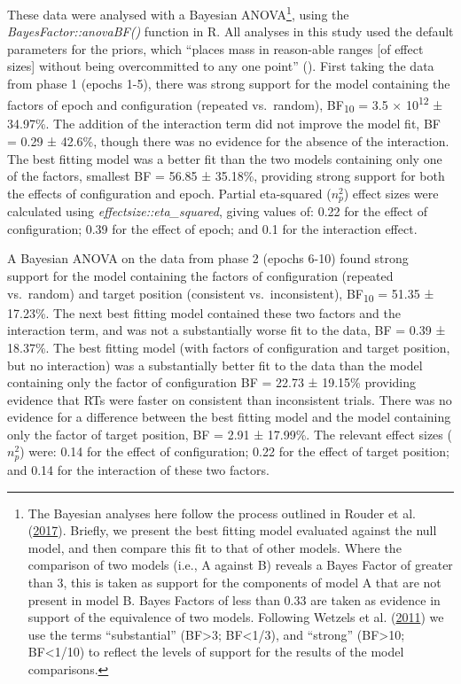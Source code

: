\documentclass[
  man,
  floatsintext,
  longtable,
  nolmodern,
  notxfonts,
  notimes,
  colorlinks=true,linkcolor=blue,citecolor=blue,urlcolor=blue]{apa7}
\begin{document}
These data were analysed with a Bayesian ANOVA\footnote{The Bayesian
  analyses here follow the process outlined in Rouder et al.
  (\hyperref[ref-rouder2017]{2017}). Briefly, we present the best
  fitting model evaluated against the null model, and then compare this
  fit to that of other models. Where the comparison of two models (i.e.,
  A against B) reveals a Bayes Factor of greater than 3, this is taken
  as support for the components of model A that are not present in model
  B. Bayes Factors of less than 0.33 are taken as evidence in support of
  the equivalence of two models. Following Wetzels et al.
  (\hyperref[ref-wetzels2011]{2011}) we use the terms ``substantial''
  (BF\textgreater3; BF\textless1/3), and ``strong'' (BF\textgreater10;
  BF\textless1/10) to reflect the levels of support for the results of
  the model comparisons.}, using the \emph{BayesFactor::anovaBF()}
function in R. All analyses in this study used the default parameters
for the priors, which ``places mass in reason-able ranges {[}of effect
sizes{]} without being overcommitted to any one point''
(). First taking
the data from phase 1 (epochs 1-5), there was strong support for the
model containing the factors of epoch and configuration (repeated
vs.~random), BF\textsubscript{10} = 3.5 × 10\textsuperscript{12} ±
34.97\%. The addition of the interaction term did not improve the model
fit, BF = 0.29 ± 42.6\%, though there was no evidence for the absence of
the interaction. The best fitting model was a better fit than the two
models containing only one of the factors, smallest BF = 56.85 ±
35.18\%, providing strong support for both the effects of configuration
and epoch. Partial eta-squared (\(n^2_p\)) effect sizes were calculated
using \emph{effectsize::eta\_squared}, giving values of: 0.22 for the
effect of configuration; 0.39 for the effect of epoch; and 0.1 for the
interaction effect.

A Bayesian ANOVA on the data from phase 2 (epochs 6-10) found strong
support for the model containing the factors of configuration (repeated
vs.~random) and target position (consistent vs.~inconsistent),
BF\textsubscript{10} = 51.35 ± 17.23\%. The next best fitting model
contained these two factors and the interaction term, and was not a
substantially worse fit to the data, BF = 0.39 ± 18.37\%. The best
fitting model (with factors of configuration and target position, but no
interaction) was a substantially better fit to the data than the model
containing only the factor of configuration BF = 22.73 ± 19.15\%
providing evidence that RTs were faster on consistent than inconsistent
trials. There was no evidence for a difference between the best fitting
model and the model containing only the factor of target position, BF =
2.91 ± 17.99\%. The relevant effect sizes (\(n^2_p\)) were: 0.14 for the
effect of configuration; 0.22 for the effect of target position; and
0.14 for the interaction of these two factors.
\end{document}
